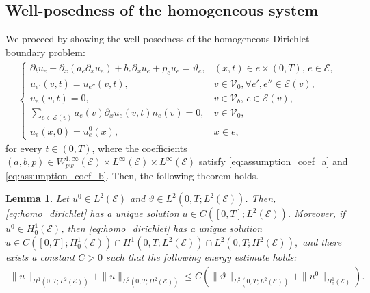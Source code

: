 \documentclass[10pt,a4paper]{amsart}
\newtheorem{lemma}{Lemma}[section]
\begin{document}
\subsection{Well-posedness of the homogeneous system}
We proceed by showing the well-posedness of the homogeneous Dirichlet boundary problem:
\begin{align}\label{eq:homo_dirichlet}
    \begin{cases}
        \partial_t u_e - \partial_{x}( a_e \partial_x u_e) + b_e \partial_x u_e + p_e u_e = \vartheta_e, & (x,t) \in e \times (0, T),  \, e \in \mathcal{E},\\
        u_{e'}(v, t) = u_{e''}(v, t), &v \in \mathcal{V}_0, \forall e', e'' \in \mathcal{E}(v), \\
        u_e(v, t) = 0, & v\in \mathcal{V}_b, \, e \in \mathcal{E}(v), \\
        \sum_{e \in \mathcal{E}(v)} a_e(v)\partial_x u_e(v, t) n_e(v) = 0, & v \in \mathcal{V}_0, \\
        u_e(x, 0) = u_e^0(x), & x \in e,
    \end{cases}
\end{align}
for every $t\in(0,T)$, where the coefficients $(a, b, p) \in W^{1,\infty}_{pw}(\mathcal{E}) \times L^{\infty}(\mathcal{E}) \times L^{\infty}(\mathcal{E})$ satisfy \eqref{eq:assumption_coef_a} and \eqref{eq:assumption_coef_b}. Then, the following theorem holds.
\begin{lemma}\label{th:well_posed_heat_graph}
    Let $u^0 \in L^2(\mathcal{E})$ and $\vartheta \in L^2(0, T; L^2(\mathcal{E}))$. Then, \eqref{eq:homo_dirichlet} has a unique solution $u \in C([0, T]; L^2(\mathcal{E}))$. Moreover, if $u^0 \in H_0^1(\mathcal{E})$, then \eqref{eq:homo_dirichlet} has a unique solution $ u \in C([0, T]; H_0^1(\mathcal{E})) \cap H^1(0, T; L^2(\mathcal{E})) \cap L^2(0, T; H^2(\mathcal{E})),$ and there exists a constant $C > 0$ such that the following energy estimate holds:
    \begin{align}\label{eq:u_estimation}
        \|u\|_{H^1(0, T; L^2(\mathcal{E}))} + \|u\|_{L^2(0, T; H^2(\mathcal{E}))} \leq C \left( \|\vartheta\|_{L^2(0, T; L^2(\mathcal{E}))} + \|u^0\|_{H^1_0(\mathcal{E})} \right).
    \end{align}
\end{lemma}
\end{document}
